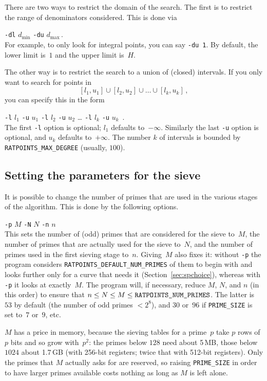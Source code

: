\documentclass[12pt,a4paper,oneside]{amsart}
\begin{document}
There are two ways to restrict the domain of the search. The first is
to restrict the range of denominators considered. This is done via \\
\strut\quad\verb+-dl+ $d_{\text{min}}$ \verb+-du+ $d_{\text{max}}$\,. \\
For example, to only look for integral points, you can say \verb+-du 1+.
By default, the lower limit is~$1$ and the upper limit is~$H$.

The other way is to restrict the search to a union of (closed) intervals.
If you only want to search for points in
\[ [l_1, u_1] \cup [l_2, u_2] \cup \dots \cup [l_k, u_k] \,, \]
you can specify this in the form \\
\strut\quad\verb+-l+ $l_1$ \verb+-u+ $u_1$ \verb+-l+ $l_2$ \verb+-u+ $u_2$ \dots
\verb+-l+ $l_k$ \verb+-u+ $u_k$ \,. \\
The first \verb+-l+ option is optional; $l_1$ defaults to~$-\infty$.
Similarly the last \verb+-u+ option is optional, and $u_k$ defaults
to~$+\infty$. The number $k$ of intervals is bounded by
\texttt{RATPOINTS\_MAX\_DEGREE} (usually, $100$).

\subsection{Setting the parameters for the sieve} \label{fd}

It is possible to change the number of primes that are used in the various
stages of the algorithm. This is done by the following options. \\
\strut\quad\verb+-p+ $M$ \verb+-N+ $N$ \verb+-n+ $n$ \\
This sets the number of (odd) primes that are considered for the sieve
to~$M$, the number of primes that are actually used for the sieve to~$N$,
and the number of primes used in the first sieving stage to~$n$. Giving~$M$
also fixes it: without \verb+-p+ the program considers
\texttt{RATPOINTS\_DEFAULT\_NUM\_PRIMES} of them to begin with and looks
further only for a curve that needs it (Section~\ref{sec:spchoice}), whereas
with \verb+-p+ it looks at exactly~$M$. The program
will, if necessary, reduce $M$, $N$, and $n$ (in this order) to ensure
that $n \le N \le M \le \text{\texttt{RATPOINTS\_NUM\_PRIMES}}$. The latter
is $53$ by default (the number of odd primes $< 2^8$), and $30$ or~$96$ if
\texttt{PRIME\_SIZE} is set to~$7$ or~$9$, etc.

$M$ has a price in memory, because the sieving tables for a prime~$p$ take
$p$ rows of $p$ bits and so grow with~$p^2$: the primes below $128$ need about
5\,MB, those below $1024$ about 1.7\,GB (with 256-bit registers;
twice that with 512-bit registers).
Only the primes that $M$ actually asks for are reserved, so raising
\texttt{PRIME\_SIZE} in order to have larger primes available costs nothing as
long as $M$ is left alone.
\end{document}
